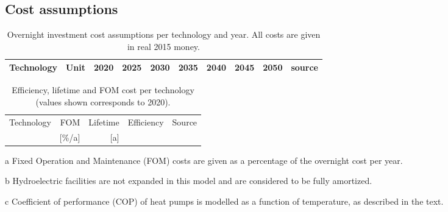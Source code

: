 \documentclass[3p]{elsarticle} %
\begin{document}
\subsection{Cost assumptions}	

\begin{table*}[!h]
\footnotesize
\centering
\begin{threeparttable}
\caption{Overnight investment cost assumptions per technology and year. All costs are given in real 2015 money. } \label{tab:cost per year}
\centering
\begin{tabularx}{18.5cm}{lccccccccr}
\toprule
Technology & Unit & 2020 & 2025 & 2030 & 2035 & 2040 & 2045 & 2050 & source\\
\midrule

\bottomrule
\end{tabularx}

\end{threeparttable}
\end{table*}

\begin{table*}
\footnotesize
\centering
\begin{threeparttable}
\caption{Efficiency, lifetime and FOM cost per technology (values shown corresponds to 2020).} \label{tab:inputs}
\centering
\begin{tabularx}{0.7\textwidth}{lrrrr}
\toprule
Technology & FOM\tnote{a} & Lifetime & Efficiency & Source\\
 & [\%/a] & [a] &  & \\
\midrule


\bottomrule
\end{tabularx}

\begin{tablenotes}
\item [a] Fixed Operation and Maintenance (FOM) costs are given as a percentage of the overnight cost per year.
\item [b] Hydroelectric facilities are not expanded in this model and are considered to be fully amortized.
\item [c] Coefficient of performance (COP) of heat pumps is modelled as a function of temperature, as described in the text. 
\end{tablenotes}
\end{threeparttable}
\end{table*}
\end{document}
